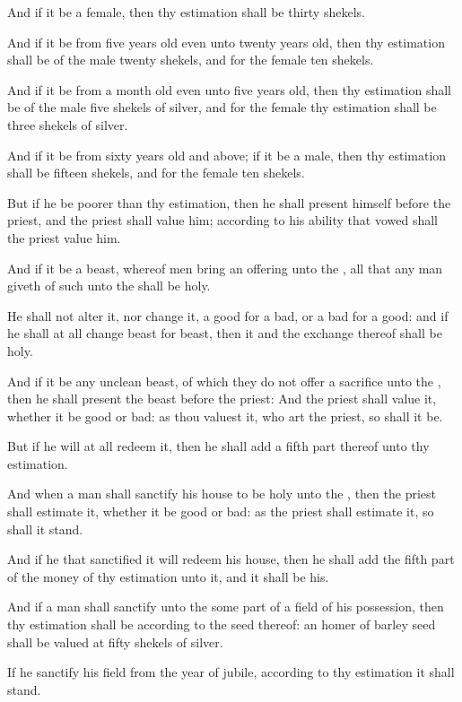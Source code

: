 \verse And if it be a female, then thy estimation shall be thirty shekels.

\verse And if it be from five years old even unto twenty years old, then thy estimation shall be of the male twenty shekels, and for the female ten shekels.

\verse And if it be from a month old even unto five years old, then thy estimation shall be of the male five shekels of silver, and for the female thy estimation shall be three shekels of silver.

\verse And if it be from sixty years old and above; if it be a male, then thy estimation shall be fifteen shekels, and for the female ten shekels.

\verse But if he be poorer than thy estimation, then he shall present himself before the priest, and the priest shall value him; according to his ability that vowed shall the priest value him.

\verse And if it be a beast, whereof men bring an offering unto the \LORD, all that any man giveth of such unto the \LORD shall be holy.

\verse He shall not alter it, nor change it, a good for a bad, or a bad for a good: and if he shall at all change beast for beast, then it and the exchange thereof shall be holy.

\verse And if it be any unclean beast, of which they do not offer a sacrifice unto the \LORD, then he shall present the beast before the priest: \verse And the priest shall value it, whether it be good or bad: as thou valuest it, who art the priest, so shall it be.

\verse But if he will at all redeem it, then he shall add a fifth part thereof unto thy estimation.

\verse And when a man shall sanctify his house to be holy unto the \LORD, then the priest shall estimate it, whether it be good or bad: as the priest shall estimate it, so shall it stand.

\verse And if he that sanctified it will redeem his house, then he shall add the fifth part of the money of thy estimation unto it, and it shall be his.

\verse And if a man shall sanctify unto the \LORD some part of a field of his possession, then thy estimation shall be according to the seed thereof: an homer of barley seed shall be valued at fifty shekels of silver.

\verse If he sanctify his field from the year of jubile, according to thy estimation it shall stand.

